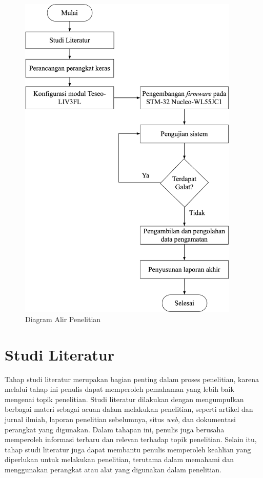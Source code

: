 \begin{figure}[H]
	\centering
	\includegraphics[width=10.5cm]{contents/chapter-3/diagram-alir-penelitian.png}
	\caption{Diagram Alir Penelitian}
	\label{Fig: diagram-alir-penelitian}
\end{figure}

\section{Studi Literatur}
Tahap studi literatur merupakan bagian penting dalam proses penelitian, karena melalui tahap ini penulis dapat memperoleh pemahaman yang lebih baik mengenai topik penelitian. Studi literatur dilakukan dengan mengumpulkan berbagai materi sebagai acuan dalam melakukan penelitian, seperti artikel dan jurnal ilmiah, laporan penelitian sebelumnya, situs \textit{web}, dan dokumentasi perangkat yang digunakan. Dalam tahapan ini, penulis juga berusaha memperoleh informasi terbaru dan relevan terhadap topik penelitian. Selain itu, tahap studi literatur juga dapat membantu penulis memperoleh keahlian yang diperlukan untuk melakukan penelitian, terutama dalam memahami dan menggunakan perangkat atau alat yang digunakan dalam penelitian. 


